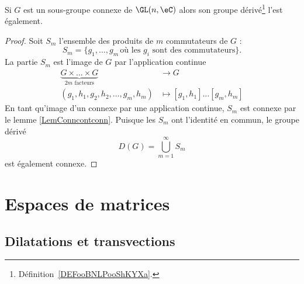 \begin{lemma}
	Si \( G\) est un sous-groupe connexe de \( \GL(n,\eC)\) alors son groupe dérivé\footnote{Définition~\ref{DEFooBNLPooShKYXa}.} l'est également.
\end{lemma}

\begin{proof}
	Soit \( S_m\) l'ensemble des produits de \( m\) commutateurs de \( G\) :
	\begin{equation}
		S_m=\{ g_1,\ldots, g_m\,\text{où les } g_i\text{ sont des commutateurs} \}.
	\end{equation}
	La partie \( S_m\) est l'image de \( G\) par l'application continue
	\begin{equation}
		\begin{aligned}
			\underbrace{G\times \ldots\times G}_{ 2m\text{ facteurs}} & \to G                             \\
			(g_1,h_1,g_2,h_2,\ldots, g_m,h_m)                         & \mapsto [g_1,h_1]\ldots [g_m,h_m]
		\end{aligned}
	\end{equation}
	En tant qu'image d'un connexe par une application continue, \( S_m\) est connexe par le lemme \ref{LemConncontconn}. Puisque les \( S_m\) ont l'identité en commun, le groupe dérivé
	\begin{equation}
		D(G)=\bigcup_{m=1}^{\infty}S_m
	\end{equation}
	est également connexe.
\end{proof}

\section{Espaces de matrices}

\subsection{Dilatations et transvections}

